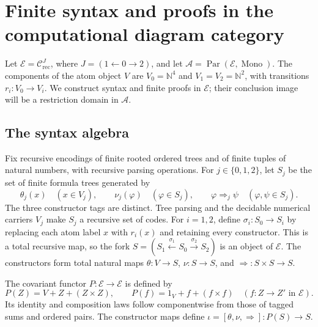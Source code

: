 \documentclass[11pt]{article}
\newcommand{\N}{\mathbb N}
\begin{document}
\section{Finite syntax and proofs in the computational diagram category}
\label{app:fork-proofs}

Let $\mathcal E=\mathcal C_{\mathrm{rec}}^{J}$, where
$J=(1\leftarrow0\to2)$, and let
$\mathcal A=\operatorname{Par}(\mathcal E,\operatorname{Mono})$.
The components of the atom object $V$ are $V_0=\N^4$ and
$V_1=V_2=\N^2$, with transitions $r_i:V_0\to V_i$.
We construct syntax and finite proofs in $\mathcal E$; their
conclusion image will be a restriction domain in $\mathcal A$.

\subsection{The syntax algebra}

Fix recursive encodings of finite rooted ordered trees and of finite
tuples of natural numbers, with recursive parsing operations. For
$j\in\{0,1,2\}$, let $S_j$ be the set of finite formula trees
generated by
\[
 \theta_j(x)\quad(x\in V_j),\qquad
 \nu_j(\varphi)\quad(\varphi\in S_j),\qquad
 \varphi\Rightarrow_j\psi\quad(\varphi,\psi\in S_j).
\]
The three constructor tags are distinct. Tree parsing and the
decidable numerical carriers $V_j$ make $S_j$ a recursive set of
codes. For $i=1,2$, define $\sigma_i:S_0\to S_i$ by replacing
each atom label $x$ with $r_i(x)$ and retaining every constructor.
This is a total recursive map, so the fork
$S=(S_1\xleftarrow{\sigma_1}S_0\xrightarrow{\sigma_2}S_2)$
is an object of $\mathcal E$. The constructors form total natural
maps $\theta:V\to S$, $\nu:S\to S$, and
$\Rightarrow:S\times S\to S$.

The covariant functor $P:\mathcal E\to\mathcal E$ is defined by
\[
 P(Z)=V+Z+(Z\times Z),\qquad
 P(f)=1_V+f+(f\times f)
 \quad(f:Z\to Z'\text{ in }\mathcal E).
\]
Its identity and composition laws follow componentwise from those
of tagged sums and ordered pairs. The constructor maps define
$\iota=[\theta,\nu,\Rightarrow]:P(S)\to S$.
\end{document}
